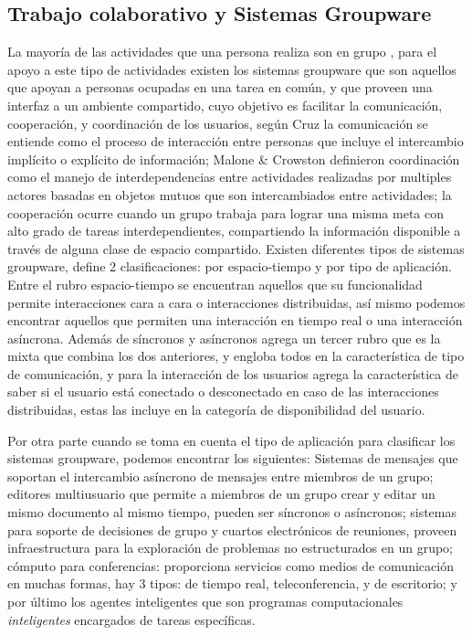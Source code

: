 \subsection{Trabajo colaborativo y Sistemas Groupware}

La mayor\'ia de las actividades que una persona realiza son en grupo \cite{ellis1991groupware}, para el apoyo a este tipo de actividades existen los sistemas groupware que son aquellos que apoyan a personas ocupadas en una tarea en com\'un, y que proveen una interfaz a un ambiente compartido, \cite{ellis1991groupware} cuyo objetivo es facilitar la comunicaci\'on, cooperaci\'on, y coordinaci\'on de los usuarios, seg\'un Cruz \cite{cruz2012towards} la comunicaci\'on se entiende como el proceso de interacci\'on entre personas que incluye el intercambio impl\'icito o expl\'icito de informaci\'on; Malone \& Crowston \cite{malone1994interdisciplinary} definieron coordinaci\'on como el manejo de interdependencias entre actividades realizadas por multiples actores basadas en objetos mutuos que son intercambiados entre actividades; la cooperaci\'on ocurre cuando un grupo trabaja para lograr una misma meta \cite{malone1994interdisciplinary} con alto grado de tareas interdependientes, compartiendo la informaci\'on disponible a trav\'es de alguna clase de espacio compartido. Existen diferentes tipos de sistemas groupware, \cite{ellis1991groupware} define 2 clasificaciones: por espacio-tiempo y por tipo de aplicaci\'on. Entre el rubro espacio-tiempo se encuentran aquellos que su funcionalidad permite interacciones cara a cara o interacciones distribuidas, as\'i mismo podemos encontrar aquellos que permiten una interacci\'on en tiempo real o una interacci\'on as\'incrona. Adem\'as de s\'incronos y as\'incronos agrega un tercer rubro que es la mixta que combina los dos anteriores, y engloba todos en la caracter\'istica de tipo de comunicaci\'on, y para la interacci\'on de los usuarios agrega la caracter\'istica de saber si el usuario est\'a conectado o desconectado en caso de las interacciones distribuidas, estas las incluye en la categor\'ia de disponibilidad del usuario\cite{antunes2014reviewing}.

Por otra parte cuando se toma en cuenta el tipo de aplicaci\'on para clasificar los sistemas groupware, podemos encontrar los siguientes: Sistemas de mensajes que soportan el intercambio as\'incrono de mensajes entre miembros de un grupo; editores multiusuario que permite a miembros de un grupo crear y editar un mismo documento al mismo tiempo, pueden ser s\'incronos o as\'incronos; sistemas para soporte de decisiones de grupo y cuartos electr\'onicos de reuniones, proveen infraestructura para la exploraci\'on de problemas no estructurados en un grupo; c\'omputo para conferencias: proporciona servicios como medios de comunicaci\'on en muchas formas, hay 3 tipos: de tiempo real, teleconferencia, y de escritorio; y por \'ultimo los agentes inteligentes que son programas computacionales \textit{inteligentes} encargados de tareas espec\'ificas.

